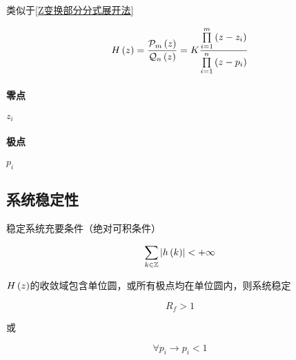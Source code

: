 \documentclass{article}
\begin{document}
类似于\ref{Z变换部分分式展开法}

\[H\left(z\right)=\frac{\mathcal P_m\left(z\right)}{\mathcal Q_n\left(z\right)}
    =K\frac{\prod\limits_{i=1}^m\left(z-z_i\right)}
    {\prod\limits_{i=1}^n\left(z-p_i\right)}\]

\paragraph{零点}$z_i$

\paragraph{极点}$p_i$

\subsection{系统稳定性}

稳定系统充要条件（绝对可积条件）

\[\sum_{k\in\mathbb Z}\left|h\left(k\right)\right|<+\infty\]

$H\left(z\right)$的收敛域包含单位圆，或所有极点均在单位圆内，则系统稳定

\[R_f>1\]

或

\[\forall p_i\to p_i<1\]
\end{document}
